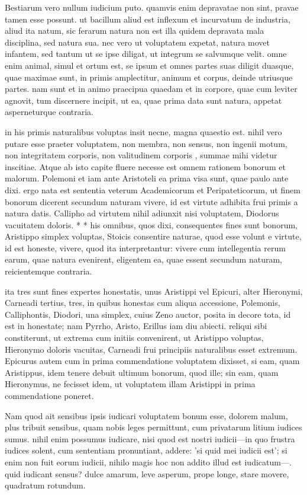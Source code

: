  Bestiarum vero nullum iudicium puto. quamvis enim depravatae non sint, pravae tamen esse possunt. ut bacillum aliud est inflexum et incurvatum de industria, aliud ita natum, sic ferarum natura non est illa quidem depravata mala disciplina, sed natura sua. nec vero ut voluptatem expetat, natura movet infantem, sed tantum ut se ipse diligat, ut integrum se salvumque velit. omne enim animal, simul et ortum est, se ipsum et omnes partes suas diligit duasque, quae maximae sunt, in primis amplectitur, animum et corpus, deinde utriusque partes. nam sunt et in animo praecipua quaedam et in corpore, quae cum leviter agnovit, tum discernere incipit, ut ea, quae prima data sunt natura, appetat asperneturque contraria.

 in his primis naturalibus voluptas insit necne, magna quaestio est. nihil vero putare esse praeter voluptatem, non membra, non sensus, non ingenii motum, non integritatem corporis, non valitudinem corporis , summae mihi videtur inscitiae. Atque ab isto capite fluere necesse est omnem rationem bonorum et malorum. Polemoni et iam ante Aristoteli ea prima visa sunt, quae paulo ante dixi. ergo nata est sententia veterum Academicorum et Peripateticorum, ut finem bonorum dicerent secundum naturam vivere, id est virtute adhibita frui primis a natura datis. Callipho ad virtutem nihil adiunxit nisi voluptatem, Diodorus vacuitatem doloris. * * his omnibus, quos dixi, consequentes fines sunt bonorum, Aristippo simplex voluptas, Stoicis consentire naturae, quod esse volunt e virtute, id est honeste, vivere, quod ita interpretantur: vivere cum intellegentia rerum earum, quae natura evenirent, eligentem ea, quae essent secundum naturam, reicientemque contraria.

 ita tres sunt fines expertes honestatis, unus Aristippi vel Epicuri, alter Hieronymi, Carneadi tertius, tres, in quibus honestas cum aliqua accessione, Polemonis, Calliphontis, Diodori, una simplex, cuius Zeno auctor, posita in decore tota, id est in honestate; nam Pyrrho, Aristo, Erillus iam diu abiecti. reliqui sibi constiterunt, ut extrema cum initiis convenirent, ut Aristippo voluptas, Hieronymo doloris vacuitas, Carneadi frui principiis naturalibus esset extremum. Epicurus autem cum in prima commendatione voluptatem dixisset, si eam, quam Aristippus, idem tenere debuit ultimum bonorum, quod ille; sin eam, quam Hieronymus, ne fecisset idem, ut voluptatem illam Aristippi in prima commendatione poneret.

 Nam quod ait sensibus ipsis iudicari voluptatem bonum esse, dolorem malum, plus tribuit sensibus, quam nobis leges permittunt, cum privatarum litium iudices sumus. nihil enim possumus iudicare, nisi quod est nostri iudicii—in quo frustra iudices solent, cum sententiam pronuntiant, addere: 'si quid mei iudicii est'; si enim non fuit eorum iudicii, nihilo magis hoc non addito illud est iudicatum—. quid iudicant sensus? dulce amarum, leve asperum, prope longe, stare movere, quadratum rotundum.

